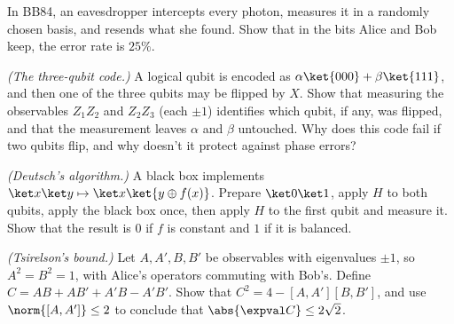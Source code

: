 \begin{problems}
 \label{prob:bb84} In BB84, an eavesdropper intercepts every photon, measures it in a randomly chosen basis, and resends what she found. Show that in the bits Alice and Bob keep, the error rate is $25\%$.

\core \label{prob:bitflip} \emph{(The three-qubit code.)} A logical qubit is encoded as $\alpha\ket{000}+\beta\ket{111}$, and then one of the three qubits may be flipped by $X$. Show that measuring the observables $Z_1Z_2$ and $Z_2Z_3$ (each $\pm1$) identifies which qubit, if any, was flipped, and that the measurement leaves $\alpha$ and $\beta$ untouched. Why does this code fail if two qubits flip, and why doesn't it protect against phase errors?

 \label{prob:deutsch} \emph{(Deutsch's algorithm.)} A black box implements $\ket x\ket y\mapsto\ket x\ket{y\oplus f(x)}$. Prepare $\ket0\ket1$, apply $H$ to both qubits, apply the black box once, then apply $H$ to the first qubit and measure it. Show that the result is $0$ if $f$ is constant and $1$ if it is balanced.

 \label{prob:tsirelson} \emph{(Tsirelson's bound.)} Let $A, A', B, B'$ be observables with eigenvalues $\pm1$, so $A^2 = B^2 = 1$, with Alice's operators commuting with Bob's. Define $C = AB + AB' + A'B - A'B'$. Show that $C^2 = 4 - [A,A'][B,B']$, and use $\norm{[A,A']}\le2$ to conclude that $\abs{\expval C}\le2\sqrt2$.
\end{problems}

\begin{reading}
\end{reading}
